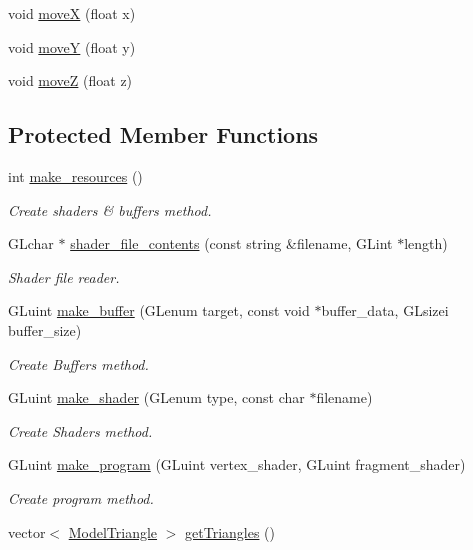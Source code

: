 \begin{DoxyCompactItemize}
\item 
void \hyperlink{classGameAsset_a9a3d6f67fb27e862458a02a7a7eb55dd}{move\-X} (float x)
\item 
void \hyperlink{classGameAsset_a5252c2f4119fdc5be9bc8827fb351374}{move\-Y} (float y)
\item 
void \hyperlink{classGameAsset_adfd83d678c0266dfc919bae6b6543495}{move\-Z} (float z)
\end{DoxyCompactItemize}
\subsection*{Protected Member Functions}
\begin{DoxyCompactItemize}
\item 
int \hyperlink{classGameAsset_aa26d85233ece476d599adf90074e9568}{make\-\_\-resources} ()
\begin{DoxyCompactList}\small\item\em Create shaders \& buffers method. \end{DoxyCompactList}\item 
G\-Lchar $\ast$ \hyperlink{classGameAsset_a08c617aafc70dcba441f53260f1bb09f}{shader\-\_\-file\-\_\-contents} (const string \&filename, G\-Lint $\ast$length)
\begin{DoxyCompactList}\small\item\em Shader file reader. \end{DoxyCompactList}\item 
G\-Luint \hyperlink{classGameAsset_adfe27369433f07092b08f24b0feedfc9}{make\-\_\-buffer} (G\-Lenum target, const void $\ast$buffer\-\_\-data, G\-Lsizei buffer\-\_\-size)
\begin{DoxyCompactList}\small\item\em Create Buffers method. \end{DoxyCompactList}\item 
G\-Luint \hyperlink{classGameAsset_ac728e885b52c93c3e4976a339de54545}{make\-\_\-shader} (G\-Lenum type, const char $\ast$filename)
\begin{DoxyCompactList}\small\item\em Create Shaders method. \end{DoxyCompactList}\item 
G\-Luint \hyperlink{classGameAsset_a9d9574a21cf6b52f7a825879ca50b19d}{make\-\_\-program} (G\-Luint vertex\-\_\-shader, G\-Luint fragment\-\_\-shader)
\begin{DoxyCompactList}\small\item\em Create program method. \end{DoxyCompactList}\item 
vector$<$ \hyperlink{classModelTriangle}{Model\-Triangle} $>$ \hyperlink{classGameAsset_aad7eeea6e2a9544fd2b2fff522cca56b}{get\-Triangles} ()
\end{DoxyCompactItemize}
